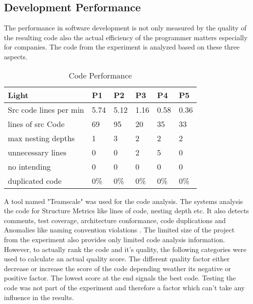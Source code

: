 \subsection{Development Performance}
The performance in software development is not only measured by the quality of the resulting code also the actual efficiency of the programmer matters especially for companies.
The code from the experiment is analyzed based on these three aspects.  

\begin{table}[ht]
  \begin{tabular}{|P{2.5cm}|P{1.8cm}|P{1.8cm}|P{1.8cm}|P{1.8cm}|P{1.8cm}|}
   	\textbf{Light}				& \textbf{P1}			& \textbf{P2}			& 	\textbf{P3}		& 	\textbf{P4}			& 	\textbf{P5}			\\ \hline
  	Src code lines per min	& 5.74						& 5.12						& 	1.16					& 0.58						& 0.36						\\ \hline
  	lines of src Code 			& 69							& 95							& 	20					& 35							& 33							\\ \hline
  	max nesting depths		& 1							& 3							& 	2						& 2							& 2							\\ \hline
  	unnecessary lines			& 0							& 0							& 	2						& 5							& 0							\\ \hline
  	no intending					& 0							& 0							& 	0						& 0							& 0							\\ \hline
  	duplicated code			& 0\%						& 0\%						&	 0\%					& 0\%						& 0\%						\\ \hline
  	\end{tabular}
  	\newline\newline
  	\caption{Code Performance}\label{codePerformance}
\end{table}

A tool named "Teamscale" was used for the code analysis. The systems analysis the code for Structure Metrics like lines of code, nesting depth etc. It also detects comments, test coverage, architecture conformance, code duplications and Anomalies like naming convention violations \cite{heinemann2014teamscale}.
\bigbreak
The limited size of the project from the experiment also provides only limited code analysis information. However, to actually rank the code and it's quality, the following categories were used to calculate an actual quality score. 
The different quality factor either decrease or increase the score of the code depending weather its  negative or positive factor. The lowest score at the end signals the best code. 
Testing the code was not part of the experiment and therefore a factor which can't take any influence in the results. 

